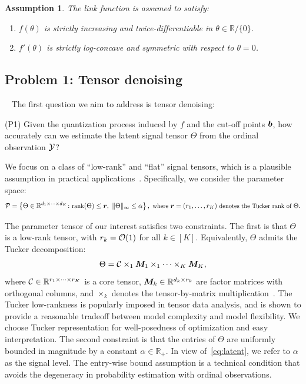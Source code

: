 \documentclass{article}
\theoremstyle{plain}
\newtheorem{assumption}{Assumption}
\theoremstyle{definition}
\begin{document}
\begin{assumption}\label{ass:link}
The link function is assumed to satisfy:
\vspace{-.3cm}
\begin{enumerate}
\item $f(\theta)$ is strictly increasing and twice-differentiable in $\theta\in\mathbb{R}/\{0\}$.
\vspace{-.2cm}
\item $f'(\theta)$ is strictly log-concave and symmetric with respect to $\theta=0$.
\end{enumerate}
\end{assumption}

\vspace{-.2cm}
\subsection{Problem 1: Tensor denoising}~\label{sec:denoising}
The first question we aim to address is tensor denoising:

(P1) Given the quantization process induced by $f$ and the cut-off points $\bm{b}$, how accurately can we estimate the latent signal tensor $\Theta$ from the ordinal observation $\mathcal{Y}$?

We focus on a class of ``low-rank'' and ``flat'' signal tensors, which is a plausible assumption in practical applications~\cite{zhou2013tensor,bhaskar20151}. Specifically, we consider the parameter space:
\begin{equation}\label{eq:space}
\small \tP=\left\{\Theta\in\mathbb{R}^{d_1\times \cdots \times d_K} \colon \text{rank}(\Theta)\leq \mr,\ \mnormSize{}{\Theta}\leq \alpha\right\},\text{ where }\mr=(r_1,\ldots,r_K) \text{ denotes the Tucker rank of } \Theta.
\end{equation}

The parameter tensor of our interest satisfies two constraints. The first is that $\Theta$ is a low-rank tensor, with $r_k=\mathcal{O}(1)$ for all $k\in[K]$. Equivalently, $\Theta$ admits the Tucker decomposition:
\begin{equation}\label{eq:Tucker}
\Theta=\mathcal{C}\times_1\bm M_1\times_1 \cdots \times_K \bm M_K,
\end{equation}
where $\mathcal{C}\in\mathbb{R}^{r_1\times \cdots \times r_K}$ is a core tensor, $\bm M_k\in\mathbb{R}^{d_k\times r_k}$ are factor matrices with orthogonal columns, and $\times_k$ denotes the tensor-by-matrix multiplication~\cite{kolda2009tensor}. The Tucker low-rankness is popularly imposed in tensor data analysis, and is shown to provide a reasonable tradeoff between model complexity and model flexibility. We choose Tucker representation for well-posedness of optimization and easy interpretation.
The second constraint is that the entries of $\Theta$ are uniformly bounded in magnitude by a constant $\alpha \in \mathbb{R}_{+}$. In view of~\eqref{eq:latent}, we refer to $\alpha$ as the signal level. The entry-wise bound assumption is a technical condition that avoids the degeneracy in probability estimation with ordinal observations.
\vspace{-.2cm}
\end{document}
